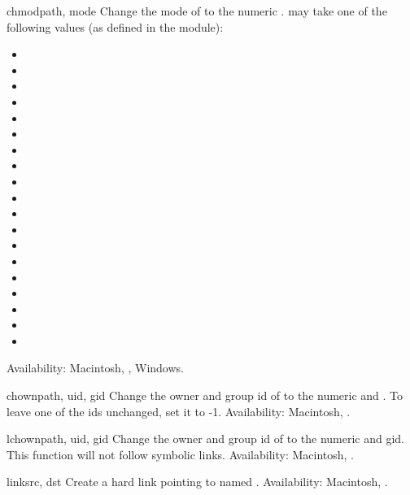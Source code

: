 \begin{funcdesc}{chmod}{path, mode}
Change the mode of  to the numeric .
 may take one of the following values
(as defined in the  module):
\begin{itemize}
  \item {}
  \item {}
  \item {}
  \item {}
  \item {}
  \item {}
  \item {}
  \item {}
  \item {}
  \item {}
  \item {}
  \item {}
  \item {}
  \item {}
  \item {}
  \item {}
  \item {}
  \item {}
  \item {}
\end{itemize}
Availability: Macintosh, \UNIX, Windows.
\end{funcdesc}

\begin{funcdesc}{chown}{path, uid, gid}
Change the owner and group id of  to the numeric 
and . To leave one of the ids unchanged, set it to -1.
Availability: Macintosh, \UNIX.
\end{funcdesc}

\begin{funcdesc}{lchown}{path, uid, gid}
Change the owner and group id of  to the numeric 
and gid. This function will not follow symbolic links.
Availability: Macintosh, \UNIX.
\end{funcdesc}

\begin{funcdesc}{link}{src, dst}
Create a hard link pointing to  named .
Availability: Macintosh, \UNIX.
\end{funcdesc}

